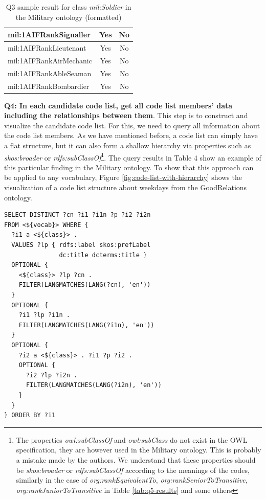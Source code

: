 \begin{table}[h]
\begin{tabular}{|l|c|c|}
mil:1AIFRankSignaller     & Yes                    & No                           \\ \hline
mil:1AIFRankLieutenant    & Yes                    & No                           \\ \hline
mil:1AIFRankAirMechanic   & Yes                    & No                           \\ \hline
mil:1AIFRankAbleSeaman    & Yes                    & No                           \\ \hline
mil:1AIFRankBombardier    & Yes                    & No                           \\ \hline
\end{tabular}
\caption{Q3 sample result for class \textit{mil:Soldier} in the Military ontology (formatted)} \label{tab:q3-results}
\end{table}

\medskip
\noindent\textbf{Q4: In each candidate code list, get all code list members' data including the relationships between them}. This step is to construct and visualize the candidate code list. For this, we need to query all information about the code list members. As we have mentioned before, a code list can simply have a flat structure, but it can also form a shallow hierarchy via properties such as \textit{skos:broader} or \textit{rdfs:subClassOf}\footnote{\label{note:owlSubClass}The properties \textit{owl:subClassOf} and \textit{owl:subClass} do not exist in the OWL specification, they are however used in the Military ontology. This is probably a mistake made by the authors. We understand that these properties should be \textit{skos:broader} or \textit{rdfs:subClassOf} according to the meanings of the codes, similarly in the case of \textit{org:rankEquivalentTo}, \textit{org:rankSeniorToTransitive}, \textit{org:rankJuniorToTransitive} in Table \ref{tab:q5-results} and some others}. The query results in Table 4 show an example of this particular finding in the Military ontology. To show that this approach can be applied to any vocabulary, Figure \ref{fig:code-list-with-hierarchy} shows the visualization of a code list structure about weekdays from the GoodRelations ontology.


\begin{lstlisting}[captionpos=b, caption=Q4 -- Query to get candidate code list structure,label=lst:sparql4,basicstyle=\small\ttfamily,frame=single]
SELECT DISTINCT ?cn ?i1 ?i1n ?p ?i2 ?i2n
FROM <${vocab}> WHERE {
  ?i1 a <${class}> .
  VALUES ?lp { rdfs:label skos:prefLabel
               dc:title dcterms:title }
  OPTIONAL {
    <${class}> ?lp ?cn . 
    FILTER(LANGMATCHES(LANG(?cn), 'en'))
  }
  OPTIONAL {
    ?i1 ?lp ?i1n . 
    FILTER(LANGMATCHES(LANG(?i1n), 'en'))
  }
  OPTIONAL {
    ?i2 a <${class}> . ?i1 ?p ?i2 .
    OPTIONAL { 
      ?i2 ?lp ?i2n . 
      FILTER(LANGMATCHES(LANG(?i2n), 'en'))
    }
  }
} ORDER BY ?i1
\end{lstlisting}

